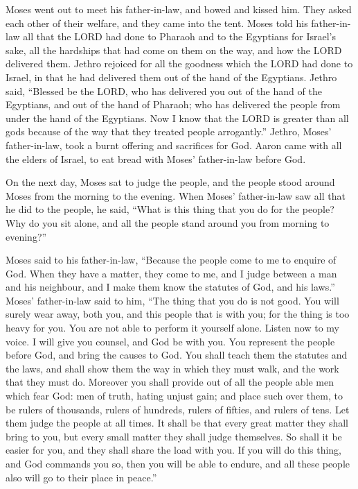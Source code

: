  Moses went out to meet his father-in-law, and bowed and
kissed him. They asked each other of their welfare, and they came into
the tent.  Moses told his father-in-law all that the LORD
had done to Pharaoh and to the Egyptians for Israel's sake, all the
hardships that had come on them on the way, and how the LORD delivered
them.  Jethro rejoiced for all the goodness which the LORD
had done to Israel, in that he had delivered them out of the hand of the
Egyptians.  Jethro said, ``Blessed be the LORD, who has
delivered you out of the hand of the Egyptians, and out of the hand of
Pharaoh; who has delivered the people from under the hand of the
Egyptians.  Now I know that the LORD is greater than all
gods because of the way that they treated people arrogantly.''
 Jethro, Moses' father-in-law, took a burnt offering and
sacrifices for God. Aaron came with all the elders of Israel, to eat
bread with Moses' father-in-law before God.

 On the next day, Moses sat to judge the people, and the
people stood around Moses from the morning to the evening.
 When Moses' father-in-law saw all that he did to the
people, he said, ``What is this thing that you do for the people? Why do
you sit alone, and all the people stand around you from morning to
evening?''

 Moses said to his father-in-law, ``Because the people
come to me to enquire of God.  When they have a matter,
they come to me, and I judge between a man and his neighbour, and I make
them know the statutes of God, and his laws.''  Moses'
father-in-law said to him, ``The thing that you do is not good.
 You will surely wear away, both you, and this people
that is with you; for the thing is too heavy for you. You are not able
to perform it yourself alone.  Listen now to my voice. I
will give you counsel, and God be with you. You represent the people
before God, and bring the causes to God.  You shall teach
them the statutes and the laws, and shall show them the way in which
they must walk, and the work that they must do.  Moreover
you shall provide out of all the people able men which fear God: men of
truth, hating unjust gain; and place such over them, to be rulers of
thousands, rulers of hundreds, rulers of fifties, and rulers of tens.
 Let them judge the people at all times. It shall be that
every great matter they shall bring to you, but every small matter they
shall judge themselves. So shall it be easier for you, and they shall
share the load with you.  If you will do this thing, and
God commands you so, then you will be able to endure, and all these
people also will go to their place in peace.''

